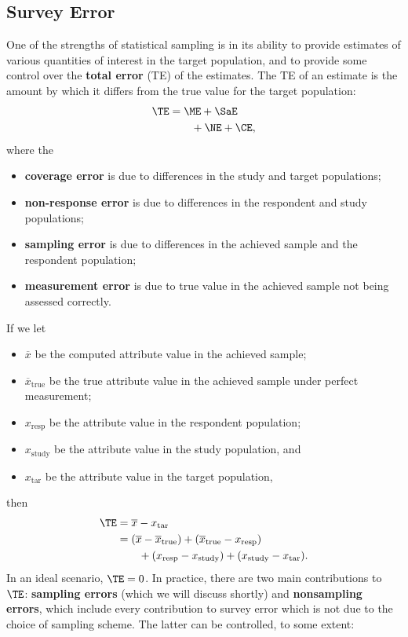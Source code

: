 \subsection{Survey Error} 
One of the strengths of statistical sampling is in its ability to provide estimates of various quantities of interest in the target population, and to provide some control over the  \textbf{total error} (TE) of the estimates. The TE of an estimate is the amount by which it differs from the true value for the target population:
\begin{align*} 
\TE  & =  \ME  +  \SaE \\ &\qquad +  \NE +  \CE, \end{align*}
where the 
\begin{itemize}[noitemsep]
\item \textbf{coverage error} is due to differences in the study and target populations; 
\item \textbf{non-response error} is due to differences in the respondent and study populations;
\item \textbf{sampling error} is due to differences in the achieved sample and the respondent population; 
\item \textbf{measurement error} is due to true value in the achieved sample not being assessed correctly.
\end{itemize}
If we let 
\begin{itemize}[noitemsep]
\item $\overline{x}$ be the computed attribute value in the achieved sample; 
\item $\overline{x}_{\mathrm{true}}$ be the true attribute value in the achieved sample under perfect measurement;
\item $x_{\mathrm{resp}}$ be the attribute value in the respondent population;
\item $x_{\mathrm{study}}$ be the attribute value in the study population, and 
\item $x_{\mathrm{tar}}$ be the attribute value in the target population,
\end{itemize}
then 
\begin{align*}\TE  &= \overline{x} - x_{\mathrm{tar}} \\ & =  (\overline{x} - \overline{x}_{\mathrm{true}}) + (\overline{x}_{\mathrm{true}}-x_{\mathrm{resp}}) \\ &\qquad + (x_{\mathrm{resp}}-x_{\mathrm{study}}) + (x_{\mathrm{study}}-x_{\mathrm{tar}}).\end{align*} In an ideal scenario, $\TE=0$. In practice, there are two main contributions to $\TE$: \textbf{sampling errors} (which we will discuss shortly) and \textbf{nonsampling errors}, which include every contribution to survey error which is not due to the choice of sampling scheme. The latter can be controlled, to some extent: 
